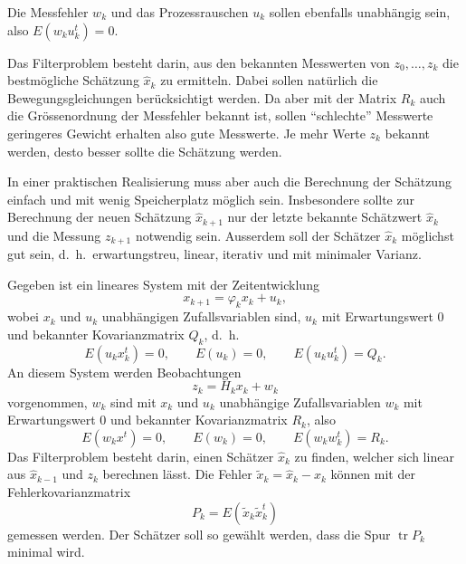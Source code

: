 Die Messfehler $w_k$ und das Prozessrauschen $u_k$ sollen ebenfalls unabhängig
sein, also $E(w_ku_k^t)=0$.

Das Filterproblem besteht darin, aus den bekannten Messwerten von $z_0,\dots,z_k$
die bestmögliche Schätzung $\hat x_k$ zu ermitteln.
Dabei sollen
natürlich die Bewegungsgleichungen berücksichtigt werden.
Da aber
mit der Matrix $R_k$ auch die Grössenordnung der Messfehler bekannt ist,
sollen ``schlechte'' Messwerte geringeres Gewicht erhalten also gute
Messwerte.
Je mehr Werte $z_k$ bekannt werden, desto besser sollte die
Schätzung werden.

In einer praktischen Realisierung muss aber auch die Berechnung der Schätzung
einfach und mit wenig Speicherplatz möglich sein.
Insbesondere sollte zur
Berechnung der neuen Schätzung $\hat x_{k+1}$ nur der letzte bekannte Schätzwert
$\hat x_k$ und die Messung $z_{k+1}$ notwendig sein.
Ausserdem soll der Schätzer
$\hat x_k$ möglichst gut sein, d.~h.~erwartungstreu, linear, iterativ und
mit minimaler Varianz.

\begin{definition}Gegeben ist ein lineares System mit der Zeitentwicklung
\[
x_{k+1}=\varphi_kx_k+u_k,
\]
wobei $x_k$ und $u_k$ unabhängigen Zufallsvariablen sind,
$u_k$ mit Erwartungswert $0$ und bekannter Kovarianzmatrix $Q_k$, d.~h.
\[
E(u_kx_k^t)=0,\qquad E(u_k)=0,\qquad E(u_ku_k^t)=Q_k.
\]
An diesem System werden Beobachtungen
\[
z_k=H_kx_k+w_k
\]
vorgenommen, $w_k$ sind mit $x_k$ und $u_k$ unabhängige Zufallsvariablen
$w_k$ mit Erwartungswert $0$ und bekannter Kovarianzmatrix $R_k$, also
\[
E(w_kx^t)=0,\qquad E(w_k)=0,\qquad E(w_kw_k^t)=R_k.
\]
Das Filterproblem besteht darin, einen Schätzer $\hat x_k$ zu
finden, welcher sich linear aus $\hat x_{k-1}$ und $z_k$ berechnen lässt.
Die Fehler $\tilde x_k=\hat x_k-x_k$ können mit der Fehlerkovarianzmatrix
\[
P_k=E(\tilde x_k\tilde x_k^t)
\]
gemessen werden.
Der Schätzer soll so gewählt werden, dass die Spur
$\operatorname{tr}P_k$ minimal wird.
\end{definition}

